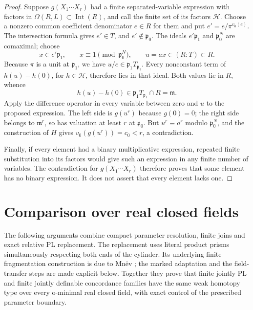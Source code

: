 \documentclass[11pt,a4paper]{article}
\theoremstyle{definition}
\begin{document}
\begin{proof}
Suppose $g(X_1\cdots X_r)$ had a finite separated-variable expression
with factors in $\Omega(R,L)\subset\operatorname{Int}(R)$, and call
the finite set of its factors $\mathcal H$. Choose a nonzero common
coefficient denominator $e\in R$ for them and put
$e'=e/\pi^{v_0(e)}$. The intersection formula gives $e'\in T$, and
$e'\notin\mathfrak p_0$. The ideals $e'\mathfrak p_1$ and
$\mathfrak p_0^N$ are comaximal; choose
\[
 x\in e'\mathfrak p_1,\qquad x\equiv1\pmod{\mathfrak p_0^N},
 \qquad u=ax\in(R:T)\subset R.
\]
Because $\pi$ is a unit at $\mathfrak p_1$, we have
$u/e\in\mathfrak p_1T_{\mathfrak p_1}$. Every nonconstant term
of $h(u)-h(0)$, for $h\in\mathcal H$, therefore lies in that ideal.
Both values lie in $R$, whence
\[
 h(u)-h(0)\in\mathfrak p_1T_{\mathfrak p_1}\cap R=\mathfrak m.
\]
Apply the difference operator in every variable between zero and $u$
to the proposed expression. The left side is $g(u^r)$ because
$g(0)=0$; the right side belongs to $\mathfrak m^r$, so has valuation
at least $r$ at $\mathfrak p_0$. But $u^r\equiv a^r$ modulo
$\mathfrak p_0^N$, and the construction of $H$ gives
$v_0(g(u^r))=c_0<r$, a contradiction.

Finally, if every element had a binary multiplicative expression,
repeated finite substitution into its factors would give such an
expression in any finite number of variables. The contradiction for
$g(X_1\cdots X_r)$ therefore proves that some element has no binary
expression. It does not assert that every element lacks one.
\end{proof}














\part{Comparison over real closed fields}
The following arguments combine compact parameter resolution,
finite joins and exact relative PL replacement.  The replacement uses
literal product prisms simultaneously respecting both ends of the
cylinder.  Its underlying finite fragmentation construction is due
to Mn\"ev \cite{Mnev2007}; the marked adaptation and the field-transfer
steps are made explicit below.  Together they prove that finite jointly
PL and finite jointly definable concordance families have the same weak
homotopy type over every o-minimal real closed field, with exact control
of the prescribed parameter boundary.
\end{document}
